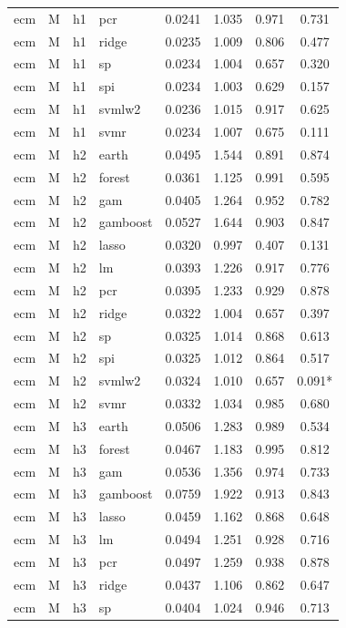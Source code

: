 \begin{ThreePartTable}
\begin{longtable}[t]{llclcccc}
ecm & M & h1 & pcr & 0.0241 & 1.035 & 0.971 & 0.731\\
ecm & M & h1 & ridge & 0.0235 & 1.009 & 0.806 & 0.477\\
ecm & M & h1 & sp & 0.0234 & 1.004 & 0.657 & 0.320\\
ecm & M & h1 & spi & 0.0234 & 1.003 & 0.629 & 0.157\\
ecm & M & h1 & svmlw2 & 0.0236 & 1.015 & 0.917 & 0.625\\
ecm & M & h1 & svmr & 0.0234 & 1.007 & 0.675 & 0.111\\
\addlinespace
ecm & M & h2 & earth & 0.0495 & 1.544 & 0.891 & 0.874\\
ecm & M & h2 & forest & 0.0361 & 1.125 & 0.991 & 0.595\\
ecm & M & h2 & gam & 0.0405 & 1.264 & 0.952 & 0.782\\
ecm & M & h2 & gamboost & 0.0527 & 1.644 & 0.903 & 0.847\\
ecm & M & h2 & lasso & 0.0320 & 0.997 & 0.407 & 0.131\\
ecm & M & h2 & lm & 0.0393 & 1.226 & 0.917 & 0.776\\
ecm & M & h2 & pcr & 0.0395 & 1.233 & 0.929 & 0.878\\
ecm & M & h2 & ridge & 0.0322 & 1.004 & 0.657 & 0.397\\
ecm & M & h2 & sp & 0.0325 & 1.014 & 0.868 & 0.613\\
ecm & M & h2 & spi & 0.0325 & 1.012 & 0.864 & 0.517\\
ecm & M & h2 & svmlw2 & 0.0324 & 1.010 & 0.657 & 0.091*\\
ecm & M & h2 & svmr & 0.0332 & 1.034 & 0.985 & 0.680\\
\addlinespace
ecm & M & h3 & earth & 0.0506 & 1.283 & 0.989 & 0.534\\
ecm & M & h3 & forest & 0.0467 & 1.183 & 0.995 & 0.812\\
ecm & M & h3 & gam & 0.0536 & 1.356 & 0.974 & 0.733\\
ecm & M & h3 & gamboost & 0.0759 & 1.922 & 0.913 & 0.843\\
ecm & M & h3 & lasso & 0.0459 & 1.162 & 0.868 & 0.648\\
ecm & M & h3 & lm & 0.0494 & 1.251 & 0.928 & 0.716\\
ecm & M & h3 & pcr & 0.0497 & 1.259 & 0.938 & 0.878\\
ecm & M & h3 & ridge & 0.0437 & 1.106 & 0.862 & 0.647\\
ecm & M & h3 & sp & 0.0404 & 1.024 & 0.946 & 0.713\\

\end{longtable}
\end{ThreePartTable}
